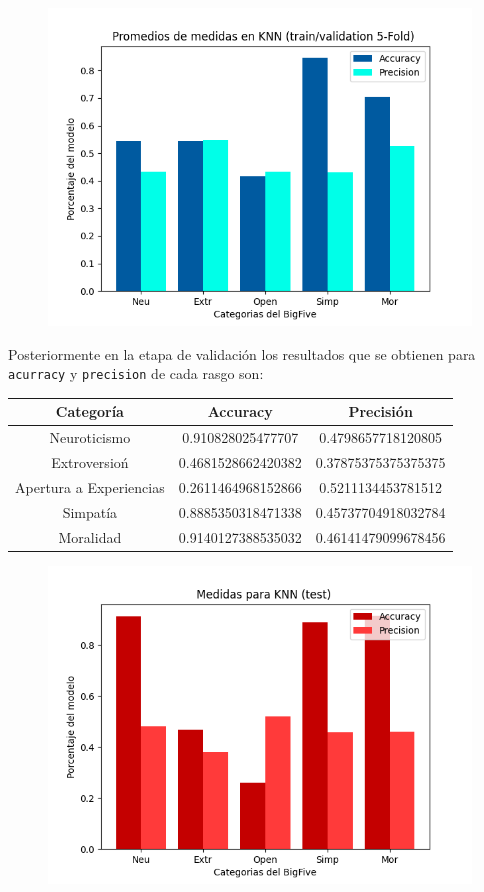 \documentclass[10pt, a4paper]{article}
\begin{document}
                \begin{figure}[H]
                    \centering
                    \includegraphics[width = 0.7\linewidth]{bar_knn.png}
                \end{figure}

                Posteriormente en la etapa de validaci\'on los resultados que se obtienen para \texttt{acurracy} y \texttt{precision} de cada rasgo son: 

                \begin{tabular}[H]{|c|c|c|}
                    \hline Categor\'ia & Accuracy & Precisi\'on \\  
                    \hline Neuroticismo             & 0.910828025477707  & 0.4798657718120805 \\
                    \hline Extroversio\'n           & 0.4681528662420382 & 0.37875375375375375 \\
                    \hline Apertura a Experiencias  & 0.2611464968152866 & 0.5211134453781512 \\
                    \hline Simpat\'ia               & 0.8885350318471338 & 0.45737704918032784 \\
                    \hline Moralidad                & 0.9140127388535032 & 0.46141479099678456 \\
                    \hline
                \end{tabular}
            
                \begin{figure}[H]
                    \centering
                    \includegraphics[width = 0.7\linewidth]{bar2_knn.png}
                \end{figure}
\end{document}
